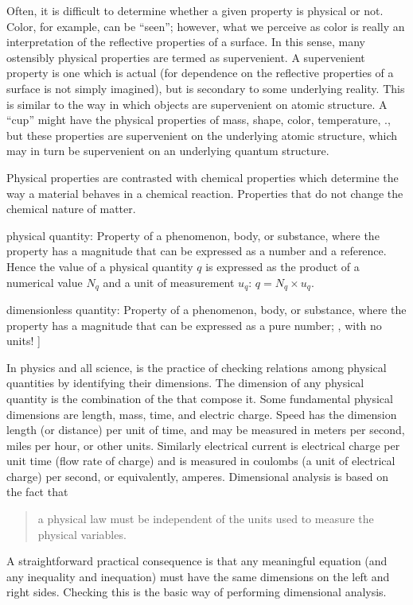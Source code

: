 Often, it is difficult to determine whether a given property is physical or not. Color, for example, can be ``seen''; however, what we perceive as color is really an interpretation of the reflective properties of a surface. In this sense, many ostensibly physical properties are termed as supervenient. A supervenient property is one which is actual (for dependence on the reflective properties of a surface is not simply imagined), but is secondary to some underlying reality. This is similar to the way in which objects are supervenient on atomic structure. A ``cup'' might have the physical properties of mass, shape, color, temperature, \etc., but these properties are supervenient on the underlying atomic structure, which may in turn be supervenient on an underlying quantum structure.

Physical properties are contrasted with chemical properties which determine the way a material behaves in a chemical reaction. Properties that do not change the chemical nature of matter.

physical quantity: Property of a phenomenon, body, or substance, where the property has a magnitude that can be expressed as a number and a reference. Hence the value of a physical quantity $q$ is expressed as the product of a numerical value $N_q$ and a unit of measurement $u_q$: $q = N_q\times u_q$.

dimensionless quantity: Property of a phenomenon, body, or substance, where the property has a magnitude that can be expressed as a pure number; \ie, with no units!
]

In physics and all science,  is the practice of checking relations among physical quantities by identifying their dimensions. The dimension of any physical quantity is the combination of the  that compose it. Some fundamental physical dimensions are length, mass, time, and electric charge. Speed has the dimension length (or distance) per unit of time, and may be measured in meters per second, miles per hour, or other units. Similarly electrical current is electrical charge per unit time (flow rate of charge) and is measured in coulombs (a unit of electrical charge) per second, or equivalently, amperes. Dimensional analysis is based on the fact that 
\begin{quote}
a physical law must be independent of the units used to measure the physical variables. 
\end{quote}
A straightforward practical consequence is that any meaningful equation (and any inequality and inequation) must have the same dimensions on the left and right sides. Checking this is the basic way of performing dimensional analysis.

